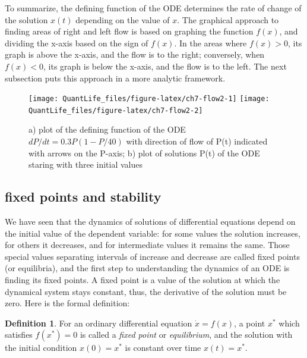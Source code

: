 \documentclass[
]{book}
\theoremstyle{definition}
\newtheorem{definition}{Definition}[chapter]
\theoremstyle{definition}
\theoremstyle{definition}
\theoremstyle{remark}
\begin{document}
To summarize, the defining function of the ODE determines the rate of change of the solution \(x(t)\) depending on the value of \(x\). The graphical approach to finding areas of right and left flow is based on graphing the function \(f(x)\), and dividing the x-axis based on the sign of \(f(x)\). In the areas where \(f(x) > 0\), its graph is above the x-axis, and the flow is to the right; conversely, when \(f(x) < 0\), its graph is below the x-axis, and the flow is to the left. The next subsection puts this approach in a more analytic framework.

\begin{figure}

{\centering \texttt{[image: QuantLife\_files/figure-latex/ch7-flow2-1]} \texttt{[image: QuantLife\_files/figure-latex/ch7-flow2-2]} 

}

\caption{a) plot of the defining function of the ODE $dP/dt = 0.3P(1-P/40)$ with direction of flow of P(t) indicated with arrows on the P-axis; b) plot of solutions P(t) of the ODE staring with three initial values}\label{fig:ch7-flow2}
\end{figure}

\hypertarget{fixed-points-and-stability}{%
\subsection{fixed points and stability}\label{fixed-points-and-stability}}

We have seen that the dynamics of solutions of differential equations depend on the initial value of the dependent variable: for some values the solution increases, for others it decreases, and for intermediate values it remains the same. Those special values separating intervals of increase and decrease are called fixed points (or equilibria), and the first step to understanding the dynamics of an ODE is finding its fixed points. A fixed point is a value of the solution at which the dynamical system stays constant, thus, the derivative of the solution must be zero. Here is the formal definition:
\begin{definition}
\protect\hypertarget{def:def-fp}{}{\label{def:def-fp} }For an ordinary differential equation \(\dot x = f(x)\), a point \(x^*\) which satisfies \(f(x^*)=0\) is called a \emph{fixed point} or \emph{equilibrium}, and the solution with the initial condition \(x(0)=x^*\) is constant over time \(x(t)=x^*\).
\end{definition}
\end{document}
